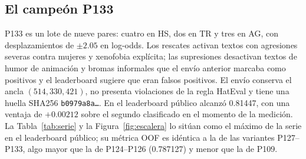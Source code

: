 \subsection{El campeón P133}

P133 es un lote de nueve pares: cuatro en HS, dos en TR y tres en AG, con
desplazamientos de $\pm2.05$ en log-odds. Los rescates activan textos con
agresiones severas contra mujeres y xenofobia explícita; las supresiones
desactivan textos de humor de animación y bromas informales que el envío
anterior marcaba como positivos y el leaderboard sugiere que eran falsos
positivos. El envío conserva el
ancla $(514,330,421)$, no presenta violaciones de la regla HatEval y tiene
una huella SHA256
\texttt{b0979a8a\ldots}. En el leaderboard público alcanzó 0.81447, con una
ventaja de $+0.00212$ sobre el segundo clasificado en el momento de la
medición. La Tabla~\ref{tab:serie} y la Figura~\ref{fig:escalera} lo sitúan
como el máximo de la serie en el leaderboard público; su métrica OOF es
idéntica a la de las variantes P127--P133, algo mayor que la de P124--P126
(0.787127) y menor que la de P109.
